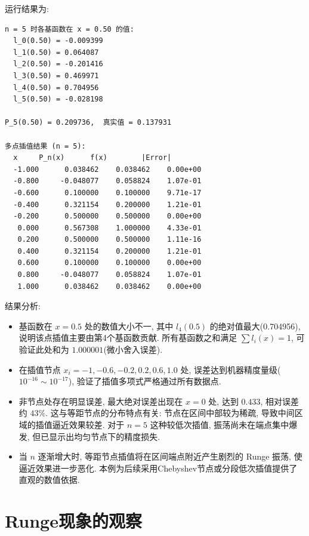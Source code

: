 \documentclass[12pt,a4paper]{ctexart}
\begin{document}
运行结果为:
\begin{lstlisting}
n = 5 时各基函数在 x = 0.50 的值:
  l_0(0.50) = -0.009399
  l_1(0.50) = 0.064087
  l_2(0.50) = -0.201416
  l_3(0.50) = 0.469971
  l_4(0.50) = 0.704956
  l_5(0.50) = -0.028198

P_5(0.50) = 0.209736,  真实值 = 0.137931

多点插值结果 (n = 5):
  x		P_n(x)		f(x)		|Error|
  -1.000	  0.038462	  0.038462	  0.00e+00
  -0.800	 -0.048077	  0.058824	  1.07e-01
  -0.600	  0.100000	  0.100000	  9.71e-17
  -0.400	  0.321154	  0.200000	  1.21e-01
  -0.200	  0.500000	  0.500000	  0.00e+00
   0.000	  0.567308	  1.000000	  4.33e-01
   0.200	  0.500000	  0.500000	  1.11e-16
   0.400	  0.321154	  0.200000	  1.21e-01
   0.600	  0.100000	  0.100000	  0.00e+00
   0.800	 -0.048077	  0.058824	  1.07e-01
   1.000	  0.038462	  0.038462	  0.00e+00
\end{lstlisting}

结果分析: 
\begin{itemize}
    \item 基函数在 $x=0.5$ 处的数值大小不一, 其中 $l_4(0.5)$ 的绝对值最大(0.704956), 说明该点插值主要由第4个基函数贡献. 所有基函数之和满足 $\sum l_i(x)=1$, 可验证此处和为 $1.000001$(微小舍入误差). 
    \item 在插值节点 $x_i = -1, -0.6, -0.2, 0.2, 0.6, 1.0$ 处, 误差达到机器精度量级($10^{-16}\sim10^{-17}$), 验证了插值多项式严格通过所有数据点. 
    \item 非节点处存在明显误差, 最大绝对误差出现在 $x=0$ 处, 达到 $0.433$, 相对误差约 $43\%$. 这与等距节点的分布特点有关: 节点在区间中部较为稀疏, 导致中间区域的插值逼近效果较差. 对于 $n=5$ 这种较低次插值, 振荡尚未在端点集中爆发, 但已显示出均匀节点下的精度损失. 
    \item 当 $n$ 逐渐增大时, 等距节点插值将在区间端点附近产生剧烈的 Runge 振荡, 使逼近效果进一步恶化. 本例为后续采用Chebyshev节点或分段低次插值提供了直观的数值依据. 
\end{itemize}
\section{Runge现象的观察}
\end{document}
